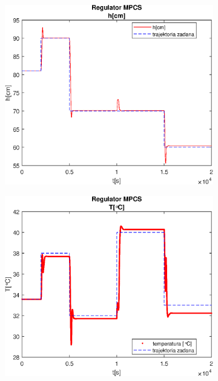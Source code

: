 \begin{figure}[h!]
   \centering
   \begin{subfigure}[b]{0.4\textwidth}
      \includegraphics[width=1\linewidth]{img/MPCSanaRK/MPCSRKHN300Nu100l10.eps}
      \caption{}
      \label{fig:fig:MPCSRKN300Nu100l101}
   \end{subfigure}
       
   \begin{subfigure}[b]{0.4\textwidth}
      \includegraphics[width=1\linewidth]{img/MPCSanaRK/MPCSRKTN300Nu100l10.eps}
      \caption{}
      \label{fig:fig:MPCSRKN300Nu100l102}
   \end{subfigure}
       

\end{figure}
